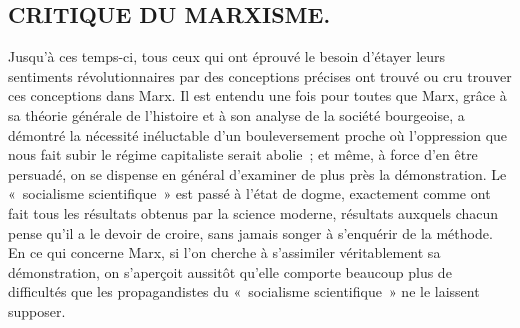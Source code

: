 \documentclass[french,twoside]{book} %
\begin{document}
\subsection[CRITIQUE DU MARXISME.]{CRITIQUE DU MARXISME.}
\noindent Jusqu'à ces temps-ci, tous ceux qui ont éprouvé le besoin d'étayer leurs sentiments révolutionnaires par des conceptions précises ont trouvé ou cru trouver ces conceptions dans Marx. Il est entendu une fois pour toutes que Marx, grâce à sa théorie générale de l'histoire et à son analyse de la société bourgeoise, a démontré la nécessité inéluctable d'un bouleversement proche où l'oppression que nous fait subir le régime capitaliste serait abolie ; et même, à force d'en être persuadé, on se dispense en général d'examiner de plus près la démonstration. Le « socialisme scientifique » est passé à l'état de dogme, exactement comme ont fait tous les résultats obtenus par la science moderne, résultats auxquels chacun pense qu'il a le devoir de croire, sans jamais songer à s'enquérir de la méthode. En ce qui concerne Marx, si l'on cherche à s'assimiler véritablement sa démonstration, on s'aperçoit aussitôt qu'elle comporte beaucoup plus de difficultés que les propagandistes du « socialisme scientifique » ne le laissent supposer.\par
\end{document}
